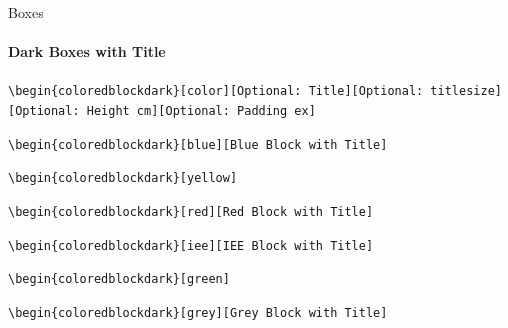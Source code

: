 \documentclass[aspectratio=169]{beamer}
\begin{document}
\begin{frame}{Boxes}
    \framesubtitle{Dark Boxes with Title}

    \footnotesize\centering\texttt{\textbackslash begin\{coloredblockdark\}[color][Optional:~Title][Optional:~titlesize][Optional:~Height cm][Optional:~Padding ex]}
    
    \begin{minipage}[t]{0.49\textwidth}
    
        \begin{coloredblockdark}
            \texttt{\textbackslash begin\{coloredblockdark\}[blue][Blue Block with Title]}\strut
        \end{coloredblockdark}

        \begin{coloredblockdark}
            \texttt{\textbackslash begin\{coloredblockdark\}[yellow]}\strut
        \end{coloredblockdark}

        \begin{coloredblockdark}
            \texttt{\textbackslash begin\{coloredblockdark\}[red][Red Block with Title]}\strut
        \end{coloredblockdark}
        
    \end{minipage}
    \hfill
    \begin{minipage}[t]{0.49\textwidth}
    
        \begin{coloredblockdark}
            \texttt{\textbackslash begin\{coloredblockdark\}[iee][IEE Block with Title]}\strut
        \end{coloredblockdark}

        \begin{coloredblockdark}
            \texttt{\textbackslash begin\{coloredblockdark\}[green]}\strut
        \end{coloredblockdark}

        \begin{coloredblockdark}
            \texttt{\textbackslash begin\{coloredblockdark\}[grey][Grey Block with Title]}\strut
        \end{coloredblockdark}
        
    \end{minipage}
\end{frame}
\end{document}
